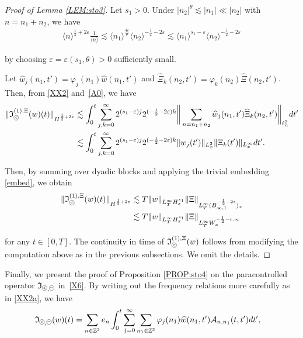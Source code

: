 \documentclass[%
11pt,  reqno]{amsart}
\newcommand{\pe}{\mathbin{\scaleobj{0.7}{\tikz \draw (0,0) node[shape=circle,draw,inner sep=0pt,minimum size=8.5pt] {\scriptsize  $=$};}}}
\newcommand{\pl}{\mathbin{\scaleobj{0.7}{\tikz \draw (0,0) node[shape=circle,draw,inner sep=0pt,minimum size=8.5pt] {\scriptsize $<$};}}}
\newcommand{\1}{\hspace{0.2mm}\text{I}\hspace{0.2mm}}
\newcommand{\noi}{\noindent}
\newcommand{\Z}{\mathbb{Z}}
\newcommand{\eps}{\varepsilon}
\newcommand{\ft}{\widehat}
\renewcommand{\l}{\ell}
\newcommand{\les}{\lesssim}
\newcommand{\jb}[1]
{\langle #1 \rangle}
\newcommand{\If}{\mathfrak{I}}
\newcommand{\A}{\mathcal{A}}
\numberwithin{equation}{section}
\numberwithin{theorem}{section}
\begin{document}
\begin{proof}[Proof of Lemma \ref{LEM:sto3}]
Let $s_1 >0$.
Under $|n_2|^\theta \les |n_1| \ll |n_2|$ with $n = n_1 + n_2$,
we have
\begin{align}
\jb{n}^{\frac 12+2\eps} \frac{1}{\jb{n}} 
\les \jb{n_1}^{\frac{4\eps}{\theta}}\jb{n_2}^{-\frac{1}{2}-2\eps}
\les \jb{n_1}^{s_1-\eps}\jb{n_2}^{-\frac{1}{2}-2\eps}
\label{A0}
\end{align}

\noi
by choosing $\eps = \eps (s_1, \theta) > 0$ sufficiently small.

Let $\ft w_{j}(n_1, t')
= \varphi_j(n_1)\ft w(n_1, t')$
and 
$ \ft{\Xi}_{k}(n_2, t')
=  \varphi_k(n_2)  \ft{\Xi}(n_2, t')$.
Then, 
from \eqref{XX2}
and~\eqref{A0}, 
we have
\begin{align*}
\| \If_{\pl}^{(1), \Xi}(w)(t) \|_{H^{\frac12+2\eps}}
& \les \int_0^t 
\sum_{j, k =0}^\infty
2^{(s_1-\eps)j} 2^{(-\frac{1}{2}-2\eps)k}
\bigg\|  \sum_{n =  n_1 +  n_2}
\ft w_{j}(n_1, t')
\ft{ \Xi}_{k}(n_2, t')\bigg\|_{\l^2_n} dt'\\
& \les \int_0^t 
\sum_{j, k =0}^\infty
2^{(s_1-\eps)j} 2^{(-\frac{1}{2}-2\eps)k}
\| w_{j}(t')\|_{L^{2}_x}
\| \Xi_{k}( t')\|_{L^\infty_x} dt'.
\end{align*}

\noi
Then, by summing over dyadic blocks and applying the trivial embedding \eqref{embed}, 
we obtain
\begin{align*}
\| \If_{\pl}^{(1), \Xi}(w)(t) \|_{H^{\frac12+2\eps}}
& \les T \|w\|_{L^\infty_T H_x^{s_1}}
\|\Xi\|_{L^\infty_T (B_{\infty, 1}^{-\frac 12 -2 \eps})_x}\\
& \les T \|w\|_{L^\infty_T H_x^{s_1}}
\|\Xi\|_{L^\infty_T W_x^{-\frac 12 - \eps, \infty}}
\end{align*}

\noi
for any $t \in [0, T]$.
The continuity in time of $ \If_{\pl}^{(1), \Xi}(w)$
follows
from modifying the computation above as in the previous subsections.
We omit the details.
\end{proof}





Finally, we present the proof of Proposition \ref{PROP:sto4}
on the  paracontrolled operator
$\If_{\pl, \pe}$ in~\eqref{X6}.
By writing out the frequency relations
more carefully as in \eqref{XX2a}, we have
\begin{align}
\begin{split}
\If_{\pl, \pe}(w) (t)
&  = \sum_{n \in \Z^3}e_n 
    \int_0^{t} 
\sum_{j = 0}^\infty
\sum_{n_1 \in \Z^3}
\varphi_j(n_1)
\ft w(n_1, t') \A_{n, n_1} (t, t') dt', 
\end{split}
\label{A0a}
\end{align}
\end{document}
